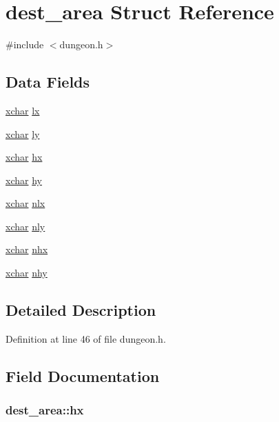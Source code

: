 \hypertarget{structdest__area}{\section{dest\+\_\+area Struct Reference}
\label{structdest__area}
}


{\ttfamily \#include $<$dungeon.\+h$>$}

\subsection*{Data Fields}
\begin{DoxyCompactItemize}
\item 
\hyperlink{global_8h_a2043b7d01ce89f4ee2fa6c345a752d32}{xchar} \hyperlink{structdest__area_a5932983ba18a545f7aec082d215a39ec}{lx}
\item 
\hyperlink{global_8h_a2043b7d01ce89f4ee2fa6c345a752d32}{xchar} \hyperlink{structdest__area_a3788f34449db2f679cda4d9d6c42ba7a}{ly}
\item 
\hyperlink{global_8h_a2043b7d01ce89f4ee2fa6c345a752d32}{xchar} \hyperlink{structdest__area_a53be01202be5ffa69a363b5310e17517}{hx}
\item 
\hyperlink{global_8h_a2043b7d01ce89f4ee2fa6c345a752d32}{xchar} \hyperlink{structdest__area_a49f5641f3f9a1fd5dc7a99e965ff68a1}{hy}
\item 
\hyperlink{global_8h_a2043b7d01ce89f4ee2fa6c345a752d32}{xchar} \hyperlink{structdest__area_a3841cd1351a730acf221e7b4bf12a198}{nlx}
\item 
\hyperlink{global_8h_a2043b7d01ce89f4ee2fa6c345a752d32}{xchar} \hyperlink{structdest__area_a1c6b08cac0b134b417e8ef813e2816be}{nly}
\item 
\hyperlink{global_8h_a2043b7d01ce89f4ee2fa6c345a752d32}{xchar} \hyperlink{structdest__area_ad1a0692d1789df6ffa4a736f6e70cfed}{nhx}
\item 
\hyperlink{global_8h_a2043b7d01ce89f4ee2fa6c345a752d32}{xchar} \hyperlink{structdest__area_acf56be5da5eddccf745d70f6b7b8922b}{nhy}
\end{DoxyCompactItemize}


\subsection{Detailed Description}


Definition at line 46 of file dungeon.\+h.



\subsection{Field Documentation}
\hypertarget{structdest__area_a53be01202be5ffa69a363b5310e17517}{
\subsubsection[{hx}]{ dest\+\_\+area\+::hx}}\label{structdest__area_a53be01202be5ffa69a363b5310e17517}


